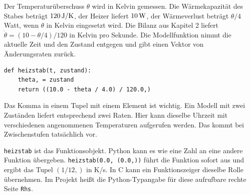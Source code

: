 Der Temperaturüberschuss \(\theta\) wird in Kelvin gemessen. Die Wärmekapazität des Stabes beträgt \(120\,\mathrm{J/K}\), der Heizer liefert \(10\,\mathrm{W}\), der Wärmeverlust beträgt \(\theta/4\) Watt, wenn \(\theta\) in Kelvin eingesetzt wird. Die Bilanz aus Kapitel 2 liefert \(\dot\theta=(10-\theta/4)/120\) in Kelvin pro Sekunde. Die Modellfunktion nimmt die aktuelle Zeit und den Zustand entgegen und gibt einen Vektor von Änderungsraten zurück.
{\small\begin{verbatim}
def heizstab(t, zustand):
    theta, = zustand
    return ((10.0 - theta / 4.0) / 120.0,)
\end{verbatim}}
Das Komma in einem Tupel mit einem Element ist wichtig. Ein Modell mit zwei Zuständen liefert entsprechend zwei Raten. Hier kann dieselbe Uhrzeit mit verschiedenen angenommenen Temperaturen aufgerufen werden. Das kommt bei Zwischenstufen tatsächlich vor.

\texttt{heizstab} ist das Funktionsobjekt. Python kann es wie eine Zahl an eine andere Funktion übergeben. \texttt{heizstab(0.0, (0.0,))} führt die Funktion sofort aus und ergibt das Tupel \((1/12,)\) in K/s. In C kann ein Funktionszeiger dieselbe Rolle übernehmen. Im Projekt heißt die Python-Typangabe für diese aufrufbare rechte Seite \texttt{Rhs}.

